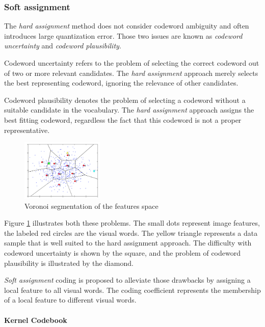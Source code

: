 \subsubsection{Soft assignment}

The \emph{hard assignment} method does not consider codeword ambiguity and often introduces large quantization error. Those two issues are known as \emph{codeword uncertainty} and \emph{codeword plausibility}. 

Codeword uncertainty refers to the problem of selecting the correct codeword out of two or more relevant candidates. The \emph{hard assignment} approach merely selects the best representing codeword, ignoring the relevance of other candidates. 

Codeword plausibility denotes the problem of selecting a codeword without a suitable candidate in the vocabulary. The \emph{hard assignment} approach assigns the best fitting codeword, regardless the fact that this codeword is not a proper representative\cite{Gemert:2008:KCS:1478172.1478227}. 

\begin{figure}[h]
\begin{center}
\includegraphics[width=0.35\textwidth]{images/soft-assignment.jpg}
\end{center}
  \caption{Voronoi segmentation of the features space}
\label{fig:softAssignment}
\end{figure}

Figure \ref{fig:softAssignment} illustrates both these problems. The small dots represent image features, the labeled red circles are the visual words. The yellow triangle represents a data sample that is well suited to the hard assignment approach. The difficulty with codeword uncertainty is shown by the square, and the problem of codeword plausibility is illustrated by the diamond.

\emph{Soft assignment} coding is proposed to alleviate those drawbacks by assigning a local feature to all visual words. The coding coefficient represents the membership of a local feature to different visual words.

\paragraph{Kernel Codebook}


